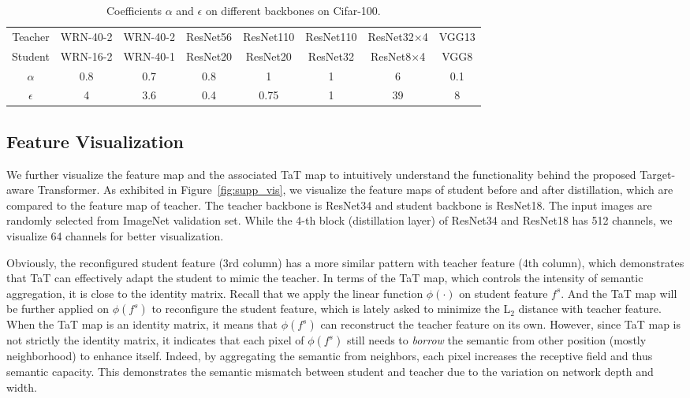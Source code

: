 \documentclass[10pt,letterpaper]{article}
\begin{document}
\begin{table*}[]
    \centering
    \caption{Coefficients $\alpha$ and $\epsilon$ on different backbones on Cifar-100.}
    \begin{tabular}{c|ccccccc}
    \toprule
        Teacher & WRN-40-2 & WRN-40-2  & ResNet56 & ResNet110 & ResNet110 & ResNet32$\times$4 & VGG13 \\
        Student & WRN-16-2 & WRN-40-1  & ResNet20 & ResNet20  & ResNet32  & ResNet8$\times$4  & VGG8 \\ \midrule 
        $\alpha$   &0.8 &0.7 &0.8 &1 &1 &6 &0.1\\
        $\epsilon$ &4 &3.6 &0.4 &0.75 &1 &39 &8\\
        \bottomrule
         
    \end{tabular}
    \label{tab:supp_cifar100_p}
\end{table*}

\subsection{Feature Visualization}
We further visualize the feature map and the associated TaT map to intuitively understand the functionality behind the proposed Target-aware Transformer. As exhibited in Figure~\ref{fig:supp_vis},  we visualize the feature maps of student before and after distillation, which are compared to the feature map of teacher. The teacher backbone is ResNet34 and student backbone is ResNet18. The input images are randomly selected from ImageNet validation set. While the 4-th block (\ie distillation layer) of ResNet34 and ResNet18 has 512 channels, we visualize 64 channels for better visualization. 

Obviously, the reconfigured student feature (3rd column) has a more similar pattern with teacher feature (4th column), which demonstrates that TaT can effectively adapt the student to mimic the teacher. In terms of the TaT map, which controls the intensity of semantic aggregation, it is close to the identity matrix. Recall that we apply the linear function $\phi(\cdot)$ on student feature $f^s$.
And the TaT map will be further applied on $\phi(f^{s})$ to reconfigure the student feature, which is lately asked to minimize the L$_2$ distance with teacher feature. When the TaT map is an identity matrix, it means that $\phi(f^{s})$ can reconstruct the teacher feature on its own. However, since TaT map is not strictly the identity matrix, it indicates that each pixel of $\phi(f^{s})$ still needs to \textit{borrow} the semantic from other position (mostly neighborhood) to enhance itself. Indeed, by aggregating the semantic from neighbors, each pixel increases the receptive field and thus semantic capacity. This demonstrates the semantic mismatch between student and teacher due to the variation on network depth and width.


{\small


}
\end{document}
